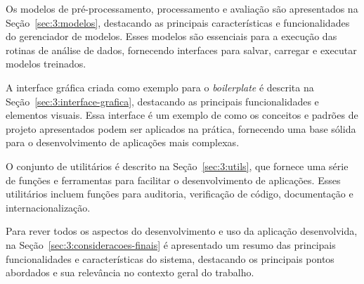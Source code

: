 Os modelos de pré-processamento, processamento e avaliação são apresentados na Seção~\ref{sec:3:modelos}, destacando as principais características e funcionalidades do gerenciador de modelos. Esses modelos são essenciais para a execução das rotinas de análise de dados, fornecendo interfaces para salvar, carregar e executar modelos treinados.

A interface gráfica criada como exemplo para o \textit{boilerplate} é descrita na Seção~\ref{sec:3:interface-grafica}, destacando as principais funcionalidades e elementos visuais. Essa interface é um exemplo de como os conceitos e padrões de projeto apresentados podem ser aplicados na prática, fornecendo uma base sólida para o desenvolvimento de aplicações mais complexas.

O conjunto de utilitários é descrito na Seção~\ref{sec:3:utils}, que fornece uma série de funções e ferramentas para facilitar o desenvolvimento de aplicações. Esses utilitários incluem funções para auditoria, verificação de código, documentação e internacionalização.

Para rever todos os aspectos do desenvolvimento e uso da aplicação desenvolvida, na Seção~\ref{sec:3:consideracoes-finais} é apresentado um resumo das principais funcionalidades e características do sistema, destacando os principais pontos abordados e sua relevância no contexto geral do trabalho.

















